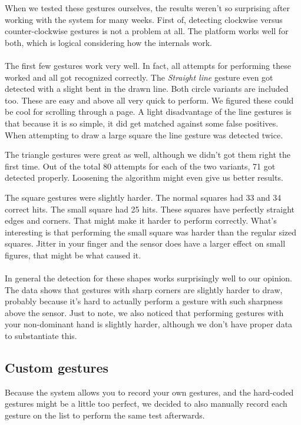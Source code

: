 \documentclass[a4paper]{article}
\begin{document}
  When we tested these gestures ourselves, the results weren't so surprising
  after working with the system for many weeks. First of, detecting clockwise
  versus counter-clockwise gestures is not a problem at all. The platform works
  well for both, which is logical considering how the internals work.

  \paragraph{}
  The first few gestures work very well. In fact, all attempts for performing
  these worked and all got recognized correctly. The \emph{Straight line}
  gesture even got detected with a slight bent in the drawn line. Both circle
  variants are included too. These are easy and above all very quick to perform.
  We figured these could be cool for scrolling through a page.
  A light disadvantage of the line gestures is that because it is so simple, it
  did get matched against some false positives. When attempting to draw a large
  square the line gesture was detected twice.

  The triangle gestures were great as well, although we didn't got them right
  the first time. Out of the total 80 attempts for each of the two variants, 71
  got detected properly. Loosening the algorithm might even give us better
  results.

  The square gestures were slightly harder. The normal squares had 33 and 34
  correct hits. The small square had 25 hits. These squares have perfectly
  straight edges and corners. That might make it harder to perform correctly.
  What's interesting is that performing the small square was harder than the
  regular sized squares. Jitter in your finger and the sensor does have a larger
  effect on small figures, that might be what caused it.

  \paragraph{}
  In general the detection for these shapes works surprisingly well to our
  opinion. The data shows that gestures with sharp corners are slightly harder
  to draw, probably because it's hard to actually perform a gesture with such
  sharpness above the sensor. Just to note, we also noticed that performing
  gestures with your non-dominant hand is slightly harder, although we don't
  have proper data to substantiate this.

  \subsection{Custom gestures}
  Because the system allows you to record your own gestures, and the hard-coded
  gestures might be a little too perfect, we decided to also manually record
  each gesture on the list to perform the same test afterwards.
\end{document}

